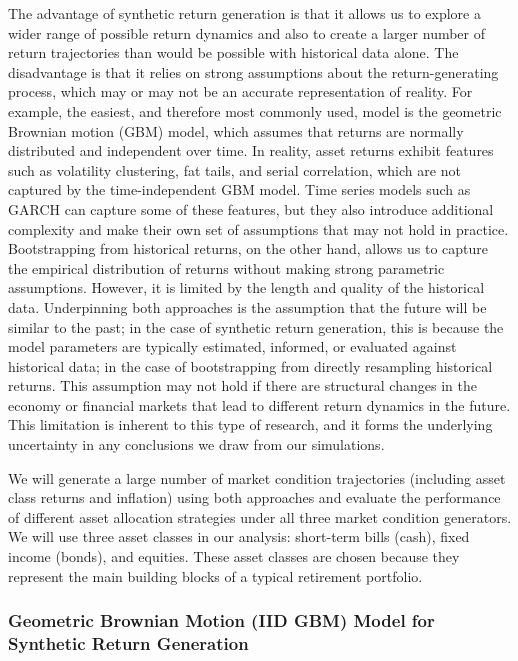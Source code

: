 \documentclass[11pt]{article}
\begin{document}
The advantage of synthetic return generation is that it allows us to explore a wider range of possible return dynamics and also to create a larger number of return trajectories than would be possible with historical data alone. The disadvantage is that it relies on strong assumptions about the return-generating process, which may or may not be an accurate representation of reality. For example, the easiest, and therefore most commonly used, model is the geometric Brownian motion (GBM) model, which assumes that returns are normally distributed and independent over time. In reality, asset returns exhibit features such as volatility clustering, fat tails, and serial correlation, which are not captured by the time-independent GBM model. Time series models such as GARCH can capture some of these features, but they also introduce additional complexity and make their own set of assumptions that may not hold in practice. Bootstrapping from historical returns, on the other hand, allows us to capture the empirical distribution of returns without making strong parametric assumptions. However, it is limited by the length and quality of the historical data. Underpinning both approaches is the assumption that the future will be similar to the past; in the case of synthetic return generation, this is because the model parameters are typically estimated, informed, or evaluated against historical data; in the case of bootstrapping from directly resampling historical returns. This assumption may not hold if there are structural changes in the economy or financial markets that lead to different return dynamics in the future. This limitation is inherent to this type of research, and it forms the underlying uncertainty in any conclusions we draw from our simulations.

We will generate a large number of market condition trajectories (including asset class returns and inflation) using both approaches and evaluate the performance of different asset allocation strategies under all three market condition generators. We will use three asset classes in our analysis: short-term bills (cash), fixed income (bonds), and equities. These asset classes are chosen because they represent the main building blocks of a typical retirement portfolio.


\subsubsection{Geometric Brownian Motion (IID GBM) Model for Synthetic Return Generation}
\end{document}

